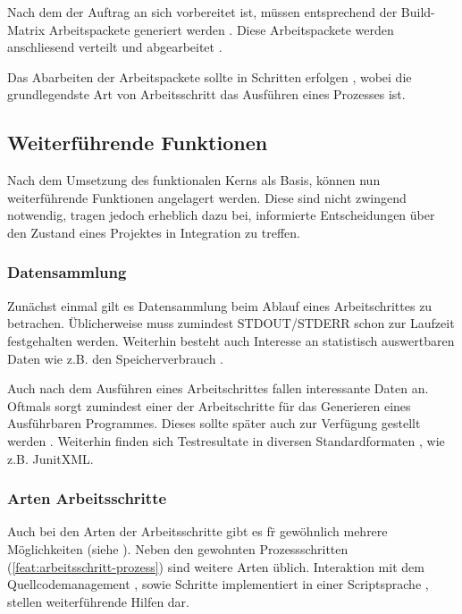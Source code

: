 Nach dem der Auftrag an sich vorbereitet ist, m\"ussen entsprechend der Build-Matrix 
Arbeitspackete generiert werden .
Diese Arbeitspackete werden anschliesend verteilt  und abgearbeitet .

Das Abarbeiten der Arbeitspackete sollte in Schritten erfolgen ,
wobei die grundlegendste Art von Arbeitsschritt das Ausf\"uhren eines Prozesses  ist.


\subsection{Weiterf\"uhrende Funktionen}

Nach dem Umsetzung des funktionalen Kerns als Basis,
k\"onnen nun weiterf\"uhrende Funktionen angelagert werden.
Diese sind nicht zwingend notwendig, tragen jedoch erheblich dazu bei,
informierte Entscheidungen \"uber den Zustand eines Projektes in Integration zu treffen.

\subsubsection{Datensammlung}

Zun\"achst einmal gilt es Datensammlung beim Ablauf eines Arbeitschrittes zu betrachen.
\"Ublicherweise muss zumindest STDOUT/STDERR schon zur Laufzeit festgehalten  werden.
Weiterhin besteht auch Interesse an statistisch auswertbaren Daten wie z.B. den Speicherverbrauch .

Auch nach dem Ausf\"uhren eines Arbeitschrittes fallen interessante Daten an.
Oftmals sorgt zumindest einer der Arbeitschritte f\"ur das Generieren eines Ausf\"uhrbaren Programmes.
Dieses sollte sp\"ater auch zur Verf\"ugung gestellt werden .
Weiterhin finden sich Testresultate in diversen Standardformaten , wie z.B. JunitXML.

\subsubsection{Arten Arbeitsschritte}

Auch bei den Arten der Arbeitsschritte gibt es f\"r gew\"ohnlich mehrere M\"oglichkeiten (siehe ).
Neben den gewohnten Prozessschritten (\cref{feat:arbeitsschritt-prozess}) sind weitere Arten \"ublich.
Interaktion mit dem Quellcodemanagement , sowie
Schritte implementiert in einer Scriptsprache ,
stellen weiterf\"uhrende Hilfen dar.



